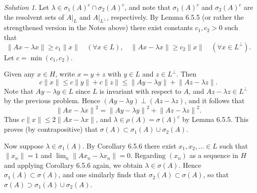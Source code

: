 \documentclass{report}
\newcommand{\norm}[1]{{\lVert #1 \rVert}}
\theoremstyle{remark}
\newtheorem*{solution}{Solution}
\begin{document}
\begin{solution}
  Let $\lambda \in \sigma_1(A)^c \cap \sigma_2(A)^c$, and note that $\sigma_1(A)^c$ and $\sigma_2(A)^c$ are the resolvent sets of $A|_L$ and $A|_{L^\perp}$, respectively. By Lemma 6.5.5 (or rather the strengthened version in the Notes above) there exist constants $c_1, c_2 > 0$ such that
  \begin{equation*}
    \norm{Ax - \lambda x} \ge c_1 \norm x \quad (\forall x \in L), \quad \norm{Ax - \lambda x} \ge c_2 \norm x \quad (\forall x \in L^\perp).
  \end{equation*}
  Let $c = \min(c_1,c_2)$.

  Given any $x \in H$, write $x = y + z$ with $y \in L$ and $z \in L^\perp$. Then
  \begin{equation*}
    c \norm x \le c \norm y + c \norm z \le \norm{Ay - \lambda y} + \norm{Az - \lambda z}.
  \end{equation*}
  Note that $Ay - \lambda y \in L$ since $L$ is invariant with respect to $A$, and $Az - \lambda z \in L^\perp$ by the previous problem. Hence $(Ay - \lambda y) \perp (Az - \lambda z)$, and it follows that
  \begin{equation*}
    \norm{Ax - \lambda x}^2 = \norm{Ay - \lambda y}^2 + \norm{Az - \lambda z}^2.
  \end{equation*}
  Thus $c \norm x \le 2 \norm{Ax - \lambda x}$, and $\lambda \in \rho(A) = \sigma(A)^c$ by Lemma 6.5.5. This proves (by contrapositive) that $\sigma(A) \subset \sigma_1(A) \cup \sigma_2(A)$.

  Now suppose $\lambda \in \sigma_1(A)$. By Corollary 6.5.6 there exist $x_1, x_2, \dotsc \in L$ such that $\norm{x_n} = 1$ and $\lim_n \norm{A x_n - \lambda x_n} = 0$. Regarding $(x_n)$ as a sequence in $H$ and applying Corollary 6.5.6 again, we obtain $\lambda \in \sigma(A)$. Hence $\sigma_1(A) \subset \sigma(A)$, and one similarly finds that $\sigma_2(A) \subset \sigma(A)$, so that $\sigma(A) \supset \sigma_1(A) \cup \sigma_2(A)$.
\end{solution}
\end{document}

